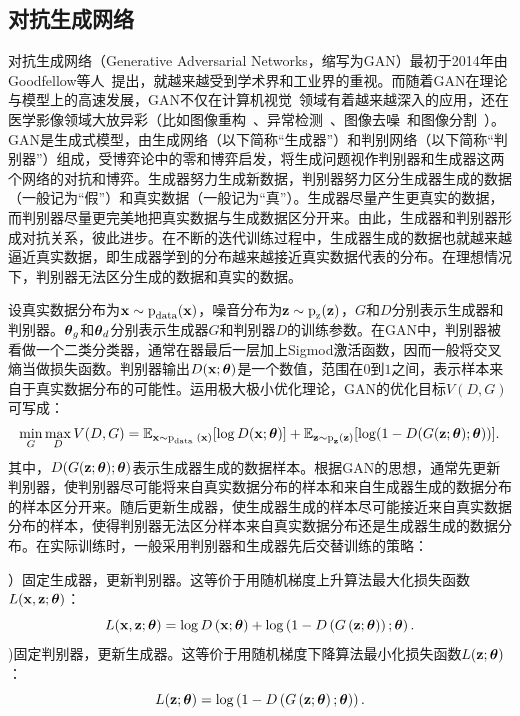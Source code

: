 \subsection{对抗生成网络}\label{subsec:gan_introduction}
对抗生成网络（Generative Adversarial Networks，缩写为GAN）最初于2014年由Goodfellow等人~\cite{goodfellow2014generative}提出，就越来越受到学术界和工业界的重视。而随着GAN在理论与模型上的高速发展，GAN不仅在计算机视觉~\cite{zhu2017unpaired}领域有着越来越深入的应用，还在医学影像领域大放异彩（比如图像重构~\cite{bhadra2020medical}、异常检测~\cite{Kohl2017AdversarialNF}、图像去噪~\cite{Yang2018LowDoseCI}和图像分割~\cite{Han2018SpineGANSS}）。GAN是生成式模型，由生成网络（以下简称“生成器”）和判别网络（以下简称“判别器”）组成，受博弈论中的零和博弈启发，将生成问题视作判别器和生成器这两个网络的对抗和博弈。生成器努力生成新数据，判别器努力区分生成器生成的数据（一般记为“假”）和真实数据（一般记为“真”）。生成器尽量产生更真实的数据，而判别器尽量更完美地把真实数据与生成数据区分开来。由此，生成器和判别器形成对抗关系，彼此进步。在不断的迭代训练过程中，生成器生成的数据也就越来越逼近真实数据，即生成器学到的分布越来越接近真实数据代表的分布。在理想情况下，判别器无法区分生成的数据和真实的数据。

设真实数据分布为$\mathbf{x}\sim \text{p}_{\text{data}}(\mathbf{x})$，噪音分布为$\mathbf{z}\sim \text{p}_{\text{z}}(\mathbf{z})$，$G$和$D$分别表示生成器和判别器。$\mbox{\boldmath $\theta$}_{g}$和$\mbox{\boldmath $\theta$}_{d}$分别表示生成器$G$和判别器$D$的训练参数。在GAN中，判别器被看做一个二类分类器，通常在器最后一层加上Sigmod激活函数，因而一般将交叉熵当做损失函数。判别器输出$D(\mathbf{x};\mbox{\boldmath $\theta$})$是一个数值，范围在$0$到$1$之间，表示样本来自于真实数据分布的可能性。运用极大极小优化理论，GAN的优化目标$V(D, G)$可写成：
\begin{eqnarray}\label{equ:gan_loss_func}
\min _{G} \max _{D} V(D, G)=\mathbb{E}_{ \mathbf{x} \sim \text{p}_{\text {data }}(\mathbf{x})}[\log D(\mathbf{x};\mbox{\boldmath $\theta$})]+\mathbb{E}_{\mathbf{z} \sim \text{p}_{\mathbf{z}}(\mathbf{z})}[\log (1-D(G(\mathbf{z};\mbox{\boldmath $\theta$});\mbox{\boldmath $\theta$}))].
\end{eqnarray}
\noindent 其中，$D(G(\mathbf{z};\mbox{\boldmath $\theta$});\mbox{\boldmath $\theta$})$表示生成器生成的数据样本。根据GAN的思想，通常先更新判别器，使判别器尽可能将来自真实数据分布的样本和来自生成器生成的数据分布的样本区分开来。随后更新生成器，使生成器生成的样本尽可能接近来自真实数据分布的样本，使得判别器无法区分样本来自真实数据分布还是生成器生成的数据分布。在实际训练时，一般采用判别器和生成器先后交替训练的策略：


）固定生成器，更新判别器。这等价于用随机梯度上升算法最大化损失函数$L(\mathbf{x},\mathbf{z};\mbox{\boldmath $\theta$})$：
	\begin{equation}
	L(\mathbf{x},\mathbf{z};\mbox{\boldmath $\theta$})=\log D\left(\mathbf{x};\mbox{\boldmath $\theta$}\right)+\log \left(1-D\left(G\left(\mathbf{z};\mbox{\boldmath $\theta$}\right)\right);\mbox{\boldmath $\theta$}\right).
	\end{equation}
)固定判别器，更新生成器。这等价于用随机梯度下降算法最小化损失函数$L(\mathbf{z};\mbox{\boldmath $\theta$})$：
	\begin{equation}
	L(\mathbf{z};\mbox{\boldmath $\theta$})=\log \left(1-D\left(G\left(\mathbf{z};\mbox{\boldmath $\theta$}\right);\mbox{\boldmath $\theta$}\right)\right).
	\end{equation}

